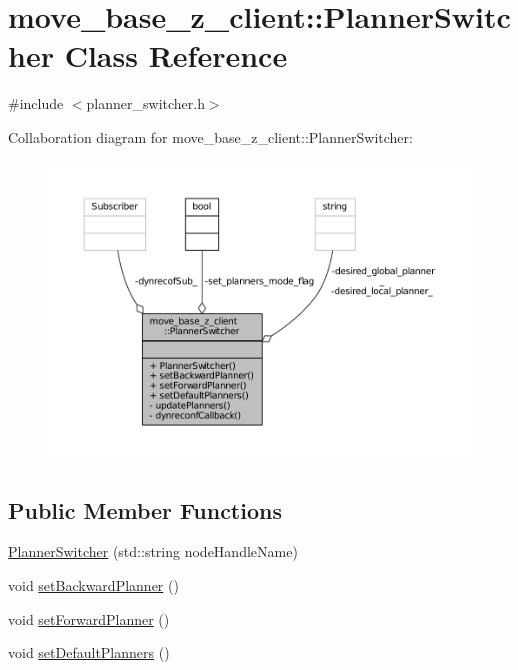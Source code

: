 \hypertarget{classmove__base__z__client_1_1PlannerSwitcher}{}\section{move\+\_\+base\+\_\+z\+\_\+client\+:\+:Planner\+Switcher Class Reference}
\label{classmove__base__z__client_1_1PlannerSwitcher}


{\ttfamily \#include $<$planner\+\_\+switcher.\+h$>$}



Collaboration diagram for move\+\_\+base\+\_\+z\+\_\+client\+:\+:Planner\+Switcher\+:
\nopagebreak
\begin{figure}[H]
\begin{center}
\leavevmode
\includegraphics[width=350pt]{classmove__base__z__client_1_1PlannerSwitcher__coll__graph}
\end{center}
\end{figure}
\subsection*{Public Member Functions}
\begin{DoxyCompactItemize}
\item 
\hyperlink{classmove__base__z__client_1_1PlannerSwitcher_a6f07fd7796bc3c9abf2c219ec33d27d3}{Planner\+Switcher} (std\+::string node\+Handle\+Name)
\item 
void \hyperlink{classmove__base__z__client_1_1PlannerSwitcher_a7688616d66fbfe6486c0cbe77e688114}{set\+Backward\+Planner} ()
\item 
void \hyperlink{classmove__base__z__client_1_1PlannerSwitcher_a4797022f304538949a2019b351ec47a8}{set\+Forward\+Planner} ()
\item 
void \hyperlink{classmove__base__z__client_1_1PlannerSwitcher_aa31306368ab2a5145c024c0c1a580547}{set\+Default\+Planners} ()
\end{DoxyCompactItemize}
